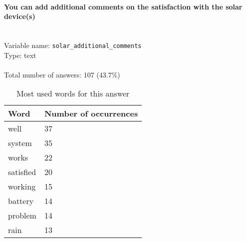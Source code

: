 \documentclass[11.5pt, a4paper]{scrartcl}
\begin{document}
\paragraph{You can add additional comments on the satisfaction with the solar device(s)}
\  \\Variable name: \texttt{solar\_additional\_comments}\\
Type: text\\
\\Total number of answers: 107 (43.7\%)
\\[0.2em]\begin{table}[H]
 \begin{tabular}{p{4cm}|p{8cm}}
Word & Number of occurrences  \\
\hline
\cellcolor{mygray}well&\cellcolor{mygray}37\\
\hline
system&35\\
\hline
\cellcolor{mygray}works&\cellcolor{mygray}22\\
\hline
satisfied&20\\
\hline
\cellcolor{mygray}working&\cellcolor{mygray}15\\
\hline
battery&14\\
\hline
\cellcolor{mygray}problem&\cellcolor{mygray}14\\
\hline
rain&13\\
\hline
\end{tabular}
\caption{\label{tab:table-name} Most used words for this answer}
\end{table}
\end{document}
